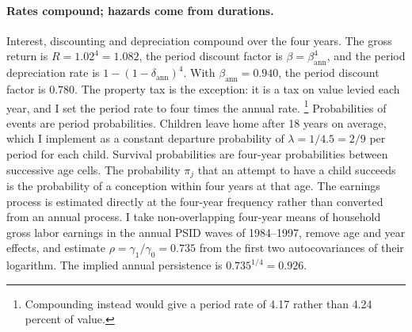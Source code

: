 \paragraph{Rates compound; hazards come from durations.}
Interest, discounting and depreciation compound over the four years. The gross
return is $R=1.02^4=1.082$, the period discount factor is $\beta=\beta_{\text{ann}}^4$,
and the period depreciation rate is $1-(1-\delta_{\text{ann}})^4$. With
$\beta_{\text{ann}}=0.940$, the period discount factor is $0.780$. The property
tax is the exception: it is a tax on value levied each year, and I set the
period rate to four times the annual rate.%
\footnote{Compounding instead would give a period rate of 4.17 rather than
4.24 percent of value.}
Probabilities of events are period probabilities. Children leave home after
18 years on average, which I implement as a constant departure probability of
$\lambda=1/4.5=2/9$ per period for each child. Survival probabilities are
four-year probabilities between successive age cells. The probability $\pi_j$
that an attempt to have a child succeeds is the probability of a conception
within four years at that age.
The earnings process is estimated directly at the four-year frequency rather
than converted from an annual process. I take non-overlapping four-year means
of household gross labor earnings in the annual PSID waves of 1984--1997,
remove age and year effects, and estimate $\rho=\gamma_1/\gamma_0=0.735$ from
the first two autocovariances of their logarithm. The implied annual
persistence is $0.735^{1/4}=0.926$.

